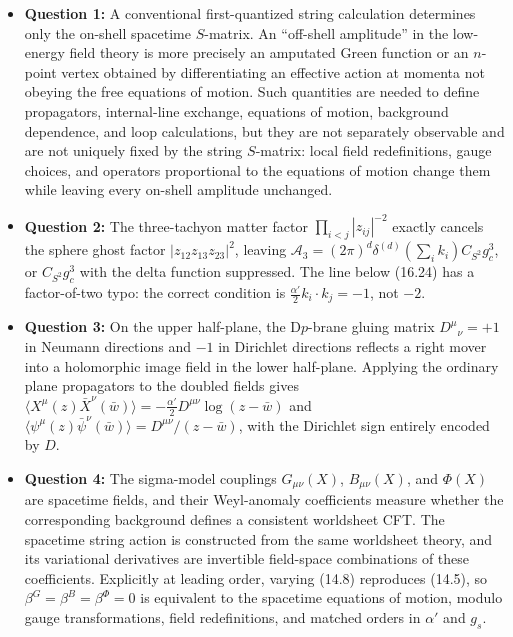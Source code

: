 \documentclass[
  10pt,
  a4paper,
  openany]{book}
\providecommand{\tightlist}{%
  \setlength{\itemsep}{0pt}\setlength{\parskip}{0pt}}
\begin{document}
\begin{itemize}
\tightlist
\item
  \textbf{Question 1:} A conventional first-quantized string calculation
  determines only the on-shell spacetime \(S\)-matrix. An ``off-shell
  amplitude'' in the low-energy field theory is more precisely an
  amputated Green function or an \(n\)-point vertex obtained by
  differentiating an effective action at momenta not obeying the free
  equations of motion. Such quantities are needed to define propagators,
  internal-line exchange, equations of motion, background dependence,
  and loop calculations, but they are not separately observable and are
  not uniquely fixed by the string \(S\)-matrix: local field
  redefinitions, gauge choices, and operators proportional to the
  equations of motion change them while leaving every on-shell amplitude
  unchanged.
\item
  \textbf{Question 2:} The three-tachyon matter factor
  \(\prod_{i<j}|z_{ij}|^{-2}\) exactly cancels the sphere ghost factor
  \(|z_{12}z_{13}z_{23}|^2\), leaving
  \(\mathcal A_3=(2\pi)^d\delta^{(d)}(\sum_i k_i)C_{S^2}g_c^3\), or
  \(C_{S^2}g_c^3\) with the delta function suppressed. The line below
  (16.24) has a factor-of-two typo: the correct condition is
  \(\frac{\alpha'}2k_i\cdot k_j=-1\), not \(-2\).
\item
  \textbf{Question 3:} On the upper half-plane, the D\(p\)-brane gluing
  matrix \(D^\mu{}_\nu=+1\) in Neumann directions and \(-1\) in
  Dirichlet directions reflects a right mover into a holomorphic image
  field in the lower half-plane. Applying the ordinary plane propagators
  to the doubled fields gives
  \(\langle X^\mu(z)\bar X^\nu(\bar w)\rangle=-\frac{\alpha'}2D^{\mu\nu}\log(z-\bar w)\)
  and
  \(\langle\psi^\mu(z)\bar\psi^\nu(\bar w)\rangle=D^{\mu\nu}/(z-\bar w)\),
  with the Dirichlet sign entirely encoded by \(D\).
\item
  \textbf{Question 4:} The sigma-model couplings \(G_{\mu\nu}(X)\),
  \(B_{\mu\nu}(X)\), and \(\Phi(X)\) are spacetime fields, and their
  Weyl-anomaly coefficients measure whether the corresponding background
  defines a consistent worldsheet CFT. The spacetime string action is
  constructed from the same worldsheet theory, and its variational
  derivatives are invertible field-space combinations of these
  coefficients. Explicitly at leading order, varying (14.8) reproduces
  (14.5), so \(\beta^G=\beta^B=\beta^\Phi=0\) is equivalent to the
  spacetime equations of motion, modulo gauge transformations, field
  redefinitions, and matched orders in \(\alpha'\) and \(g_s\).
\end{itemize}
\end{document}
